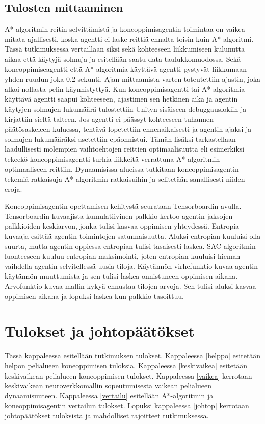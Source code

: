 \documentclass[utf8]{gradu3}
\begin{document}
\section{Tulosten mittaaminen}
\label{sec:mittaaminen}

A*-algoritmin reitin selvittämistä ja koneoppimisagentin toimintaa on vaikea mitata ajallisesti, koska agentti ei laske reittiä ennalta toisin kuin A*-algoritmi. Tässä tutkimuksessa vertaillaan siksi sekä kohteeseen liikkumiseen kulunutta aikaa että käytyjä solmuja ja esitellään saatu data taulukkomuodossa. Sekä koneoppimiseagentti että A*-algoritmia käyttävä agentti pystyvät liikkumaan yhden ruudun joka 0.2 sekunti. Ajan mittaamista varten toteutettiin ajastin, joka alkoi nollasta pelin käynnistyttyä. Kun koneoppimisagentti tai A*-algoritmia käyttävä agentti saapui kohteeseen, ajastimen sen hetkinen aika ja agentin käytyjen solmujen lukumäärä tulostettiin Unityn sisäiseen debuggauslokiin ja kirjattiin sieltä talteen. Jos agentti ei päässyt kohteeseen tuhannen päätösaskeleen kuluessa, tehtävä lopetettiin ennenaikaisesti ja agentin ajaksi ja solmujen lukumääräksi asetettiin epäonnistui. Tämän lisäksi tarkastellaan laadullisesti molempien vaihtoehtojen reittien optimaalisuutta eli esimerkiksi tekeekö koneoppimisagentti turhia liikkeitä verrattuna A*-algoritmin optimaaliseen reittiin. Dynaamisissa alueissa tutkitaan koneoppimisagentin tekemiä ratkaisuja A*-algoritmin ratkaisuihin ja selitetään sanallisesti niiden eroja.

Koneoppimisagentin opettamisen kehitystä seurataan Tensorboardin avulla. Tensorboardin kuvaajista kumulatiivinen palkkio kertoo agentin jaksojen palkkioiden keskiarvon, jonka tulisi kasvaa oppimisen yhteydessä. Entropia-kuvaaja esittää agentin toimintojen satunnaisuutta. Aluksi entropian kuuluisi olla suurta, mutta agentin oppiessa entropian tulisi tasaisesti laskea. SAC-algoritmin luonteeseen kuuluu entropian maksimointi, joten entropian kuuluisi hieman vaihdella agentin selvitellessä uusia tiloja. Käytännön virhefunktio kuvaa agentin käytännön muuttumista ja sen tulisi laskea onnistuneen oppimisen aikana. Arvofunktio kuvaa mallin kykyä ennustaa tilojen arvoja. Sen tulisi aluksi kasvaa oppimisen aikana ja lopuksi laskea kun palkkio tasoittuu.

\chapter{Tulokset ja johtopäätökset}
\label{tulokset}

Tässä kappaleessa esitellään tutkimuksen tulokset. Kappaleessa \ref{helppo} esitetään helpon pelialueen koneoppimisen tuloksia. Kappaleessa \ref{keskivaikea} esitetään keskivaikean pelialueen koneoppimisen tulokset. Kappaleessa \ref{vaikea} kerrotaan keskivaikean neuroverkkomallin sopeutumisesta vaikean pelialueen dynaamisuuteen. Kappaleessa \ref{vertailu} esitellään A*-algoritmin ja koneoppimisagentin vertailun tulokset. Lopuksi kappaleessa \ref{johtop} kerrotaan johtopäätökset tuloksista ja mahdolliset rajoitteet tutkimuksessa.
\end{document}
